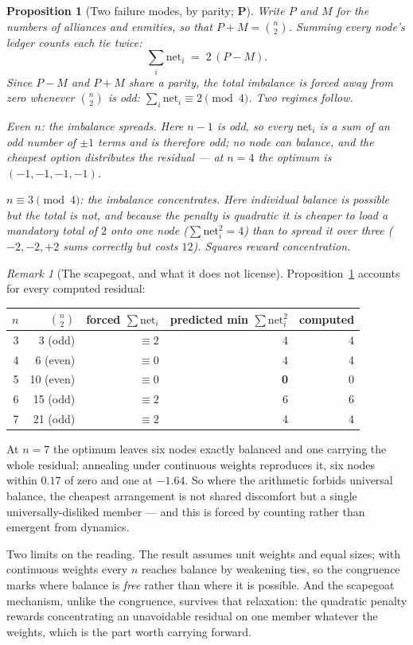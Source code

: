 \documentclass[11pt]{article}
\numberwithin{equation}{section}
\theoremstyle{plain}
\newtheorem{proposition}[theorem]{Proposition}
\theoremstyle{definition}
\theoremstyle{remark}
\newtheorem{remark}[theorem]{Remark}
\begin{document}
\begin{proposition}[Two failure modes, by parity; \textbf{P}]
\label{ad:prop:parity}
Write $P$ and $M$ for the numbers of alliances and enmities, so that
$P+M=\binom n2$. Summing every node's ledger counts each tie twice:
\begin{equation}\label{ad:eq:parity}
\sum_i \mathrm{net}_i \;=\; 2\,(P-M).
\end{equation}
Since $P-M$ and $P+M$ share a parity, the total imbalance is
\emph{forced} away from zero whenever $\binom n2$ is odd:
$\sum_i\mathrm{net}_i\equiv2\pmod 4$. Two regimes follow.

\emph{Even $n$: the imbalance spreads.} Here $n-1$ is odd, so every
$\mathrm{net}_i$ is a sum of an odd number of $\pm1$ terms and is
therefore odd; \emph{no} node can balance, and the cheapest option
distributes the residual --- at $n=4$ the optimum is $(-1,-1,-1,-1)$.

\emph{$n\equiv3\pmod4$: the imbalance concentrates.} Here individual
balance is possible but the total is not, and because the penalty is
\emph{quadratic} it is cheaper to load a mandatory total of $2$ onto one
node ($\sum\mathrm{net}_i^2=4$) than to spread it over three
($-2,-2,+2$ sums correctly but costs $12$). Squares reward
concentration.
\end{proposition}

\begin{remark}[The scapegoat, and what it does not license]
\label{ad:rem:scapegoat}
Proposition~\ref{ad:prop:parity} accounts for every computed residual:
\begin{center}\small
\begin{tabular}{@{}rrrrr@{}}
\toprule
$n$ & $\binom n2$ & forced $\sum\mathrm{net}_i$ & predicted min
$\sum\mathrm{net}_i^2$ & computed\\
\midrule
3 & 3 (odd) & $\equiv2$ & 4 & 4\\
4 & 6 (even) & $\equiv0$ & 4 & 4\\
5 & 10 (even) & $\equiv0$ & \textbf{0} & 0\\
6 & 15 (odd) & $\equiv2$ & 6 & 6\\
7 & 21 (odd) & $\equiv2$ & 4 & 4\\
\bottomrule
\end{tabular}
\end{center}
At $n=7$ the optimum leaves six nodes exactly balanced and one carrying
the whole residual; annealing under continuous weights reproduces it,
six nodes within $0.17$ of zero and one at $-1.64$. So where the
arithmetic forbids universal balance, the cheapest arrangement is not
shared discomfort but a single universally-disliked member --- and this
is forced by counting rather than emergent from dynamics.

Two limits on the reading. The result assumes unit weights and equal
sizes; with continuous weights every $n$ reaches balance by weakening
ties, so the congruence marks where balance is \emph{free} rather than
where it is possible. And the scapegoat mechanism, unlike the
congruence, survives that relaxation: the quadratic penalty rewards
concentrating an unavoidable residual on one member whatever the
weights, which is the part worth carrying forward.
\end{remark}
\end{document}
